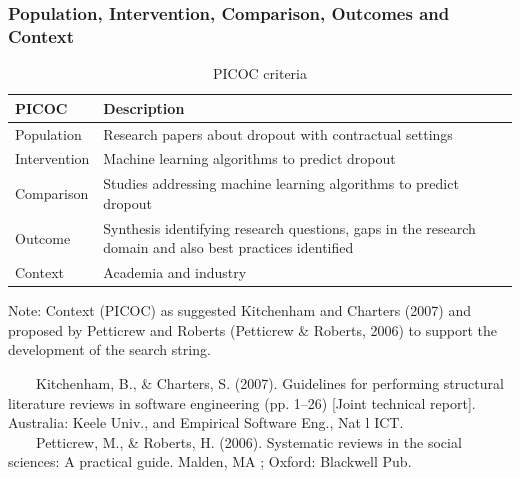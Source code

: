 \documentclass[10pt]{beamer}
\begin{document}
\begin{frame}
	\frametitle{Population, Intervention, Comparison, Outcomes and Context}
\begin{center}
\begin{table}
  \centering
  \scriptsize
  \caption{
  	PICOC criteria
  	}
    \begin{tabular}{p{3cm} p{5cm}}
    \toprule
    PICOC & Description\\
    \midrule
	Population & Research papers about dropout with contractual settings \\ \hline
	Intervention &  Machine learning algorithms to predict dropout	\\ \hline	
	Comparison & Studies addressing machine learning algorithms to predict dropout \\ \hline 
	Outcome & Synthesis identifying research questions, gaps in the research domain and also best practices identified \\ \hline
	Context & Academia and industry\\
\bottomrule
\end{tabular}
\label{Abordagens analisadas}
\begin{flushleft}
	Note: Context (PICOC) as suggested Kitchenham and Charters (2007) and proposed by Petticrew and Roberts (Petticrew \& Roberts, 2006) to support the development of the search string.
\end{flushleft}
\end{table}
\end{center}
	\tiny 
~~~~Kitchenham, B., \& Charters, S. (2007). Guidelines for performing structural literature reviews in software engineering (pp. 1–26) [Joint technical report]. Australia: Keele Univ., and Empirical Software Eng., Nat l ICT.\\
~~~~Petticrew, M., \& Roberts, H. (2006). Systematic reviews in the social sciences: A practical guide. Malden, MA ; Oxford: Blackwell Pub.\\
\end{frame}
\end{document}
